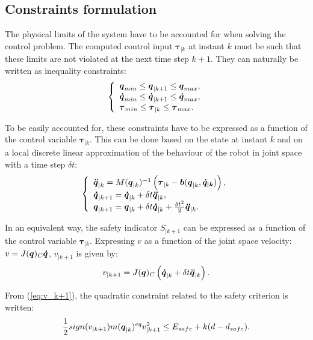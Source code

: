 \documentclass[a4paper, 10pt, conference]{ieeeconf}      %
\newcommand{\vect}[1]{\mbox{\boldmath${#1}$}}%
\begin{document}
\subsection{Constraints formulation}
The physical limits of the system have to be accounted for when solving the control problem. The computed control input $\boldsymbol{\tau}_{|k}$ at instant $k$ must be such that these limits are not violated at the next time step $k+1$. They can naturally be written as inequality constraints:
\begin{equation} 
\left\{\begin{array}{lcl}
\vect{q}_{min} \leq \vect{q}_{|k+1} \leq \vect{q}_{max}, \\
\vect{\dot{q}}_{min} \leq \vect{\dot{q}}_{|k+1} \leq \vect{\dot{q}}_{max}, \\
\boldsymbol{\tau}_{min} \leq \boldsymbol{\tau}_{|k} \leq \boldsymbol{\tau}_{max}.
\end{array}\right.
\label{eq:const_1}
\end{equation}

To be easily accounted for, these constraints have to be expressed as a function of the control variable $\boldsymbol{\tau}_{|k}$. This can be done based on the state at instant $k$ and on a local discrete linear approximation of the behaviour of the robot in joint space with a time step $\delta t$:  
\begin{equation} 
\left\{\begin{array}{l}
\vect{\ddot{q}}_{|k} = M(\vect{q}_{|k})^{-1} \left(\boldsymbol{\tau}_{|k} - \vect{b}(\vect{q}_{|k},\vect{\dot{q}_{|k}})\right),\\
\vect{\dot{q}}_{|k+1}  =  \vect{\dot{q}}_{|k} + \delta t \vect{\ddot{q}}_{|k},\\
\vect{q}_{|k+1} = \vect{q}_{|k} + \delta t \vect{\dot{q}}_{|k} + \frac{\delta t^{2}}{2} \vect{\ddot{q}}_{|k}.
\end{array}\right.
\end{equation}

In an equivalent way, the safety indicator $S_{|k+1}$ can be expressed as a function of the control variable $\boldsymbol{\tau}_{|k}$. Expressing $v$ as a function of the joint space velocity: $v = J(\vect{q})_C \vect{\dot{q}}$, $v_{|k+1}$ is given by:
\begin{equation}
 v_{|k+1} = J(\vect{q})_C \left(\vect{\dot{q}}_{|k} + \delta t \vect{\ddot{q}}_{|k} \right).
\label{eq:v_k+1}
\end{equation}

From (\ref{eq:v_k+1}), the quadratic constraint related to the safety criterion is written:
\begin{equation}
\frac{1}{2} sign(v_{|k+1})   m(\vect{q}_{|k})^{eq} v_{|k+1}^2 \leq E_{safe} +  k (d - d_{safe}).
\label{eq:const_2}
\end{equation}
\end{document}

